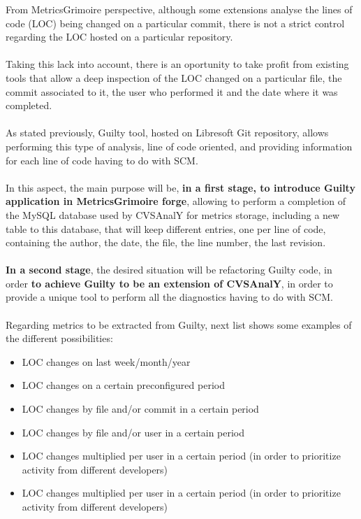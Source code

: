 \documentclass[11pt]{article}
\begin{document}
From MetricsGrimoire perspective, although some extensions analyse the lines of code (LOC) being changed on a particular commit, there is not a strict control regarding the LOC hosted on a particular repository.\\
\\
Taking this lack into account, there is an oportunity to take profit from existing tools that allow a deep inspection of the LOC changed on a particular file, the commit associated to it, the user who performed it and the date where it was completed.\\
\\
As stated previously, Guilty tool, hosted on Libresoft Git repository, allows performing this type of analysis, line of code oriented, and providing information for each line of code having to do with SCM.\\
\\
In this aspect, the main purpose will be, \textbf{in a first stage, to introduce Guilty application in MetricsGrimoire forge}, allowing to perform a completion of the MySQL database used by CVSAnalY for metrics storage, including a new table to this database, that will keep different entries, one per line of code, containing the author, the date, the file, the line number, the last revision.\\
\\
\textbf{In a second stage}, the desired situation will be refactoring Guilty code, in order \textbf{to achieve Guilty to be an extension of CVSAnalY}, in order to provide a unique tool to perform all the diagnostics having to do with SCM.\\
\\
Regarding metrics to be extracted from Guilty, next list shows some examples of the different possibilities:
\begin{itemize}
\item{LOC changes on last week/month/year}
\item{LOC changes on a certain preconfigured period}
\item{LOC changes by file and/or commit in a certain period}
\item{LOC changes by file and/or user in a certain period}
\item{LOC changes multiplied per user in a certain period} (in order to prioritize activity from different developers)
\item{LOC changes multiplied per user in a certain period} (in order to prioritize activity from different developers)
\end{itemize}
\end{document}
